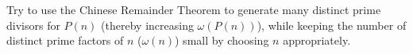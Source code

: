 Try to use the Chinese Remainder Theorem to generate many distinct prime divisors for $P(n)$ (thereby increasing $\omega(P(n))$), while keeping the number of distinct prime factors of $n$ ($\omega(n)$) small by choosing $n$ appropriately.